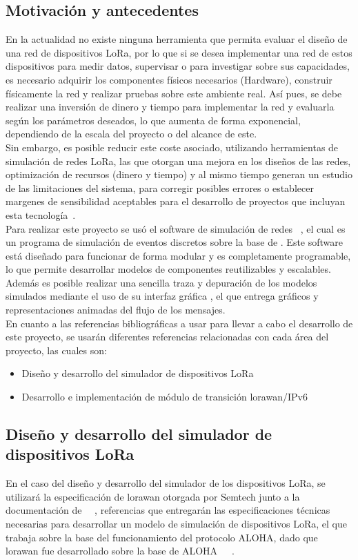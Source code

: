 \begin{justify}
\section{Motivación y antecedentes}
En la actualidad no existe ninguna herramienta que permita evaluar el diseño de una red de dispositivos LoRa, por lo que si se desea implementar una red de estos dispositivos para medir datos, supervisar o para investigar sobre sus capacidades, es necesario adquirir los componentes físicos necesarios (Hardware), construir físicamente la red y realizar pruebas sobre este ambiente real. Así pues, se debe realizar una inversión de dinero y tiempo para implementar la red y evaluarla según los parámetros deseados, lo que aumenta de forma exponencial, dependiendo de la escala del proyecto o del alcance de este.\\
Sin embargo, es posible reducir este coste asociado, utilizando herramientas de simulación de redes LoRa, las que otorgan una mejora en los diseños de las redes, optimización de recursos (dinero y tiempo) y al mismo tiempo generan un estudio de las limitaciones del sistema, para corregir posibles errores o establecer margenes de sensibilidad aceptables para el desarrollo de proyectos que incluyan esta tecnología~\cite{Xavier}.\\ 
Para realizar este proyecto se usó el software de simulación de redes \OMNET ~\cite{Omnet++}, el cual es un programa de simulación de eventos discretos sobre la base de \CC. Este software está diseñado para funcionar de forma modular y es completamente programable, lo que permite desarrollar modelos de componentes reutilizables y escalables. Además es posible realizar una sencilla traza y depuración de los modelos simulados mediante el uso de su interfaz gráfica , el que entrega gráficos y representaciones animadas del flujo de los mensajes.
\\\noindent
En cuanto a las referencias bibliográficas a usar para llevar a cabo el desarrollo de este proyecto, se usarán diferentes referencias relacionadas con cada área del proyecto, las cuales son: 
\begin{itemize}
\item Diseño y desarrollo del simulador de dispositivos LoRa
\item Desarrollo e implementación de módulo de transición \gls{lorawan}/IPv6
\end{itemize}
\subsection{Diseño y desarrollo del simulador de dispositivos LoRa}
En el caso del diseño y desarrollo del simulador de los dispositivos LoRa, se utilizará la especificación de \gls{lorawan} otorgada por Semtech junto a la documentación de \OMNET ~\cite{Sornin}~\cite{Sornin2}, referencias que entregarán las especificaciones técnicas necesarias para  desarrollar un modelo de simulación de dispositivos LoRa, el que trabaja sobre la base del funcionamiento del protocolo ALOHA, dado que \gls{lorawan} fue desarrollado sobre la base de ALOHA~\cite{Sornin}~\cite{Abdullah}~\cite{NORMAN}. 

\end{justify}
